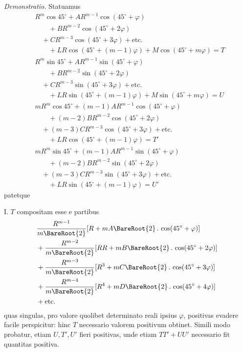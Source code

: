 \textit{Demonstratio.} Statuamus
\[
\begin{aligned}
&R^m\cos45^\circ+AR^{m-1}\cos(45^\circ+\varphi)\\
&\qquad+BR^{m-2}\cos(45^\circ+2\varphi)\\
&\quad+CR^{m-3}\cos(45^\circ+3\varphi)+\text{etc.}\\
&\qquad+LR\cos(45^\circ+(m-1)\varphi)+M\cos(45^\circ+m\varphi)=T\\
&R^m\sin45^\circ+AR^{m-1}\sin(45^\circ+\varphi)\\
&\qquad+BR^{m-2}\sin(45^\circ+2\varphi)\\
&\quad+CR^{m-3}\sin(45^\circ+3\varphi)+\text{etc.}\\
&\qquad+LR\sin(45^\circ+(m-1)\varphi)+M\sin(45^\circ+m\varphi)=U\\
&mR^m\cos45^\circ+(m-1)AR^{m-1}\cos(45^\circ+\varphi)\\
&\qquad+(m-2)BR^{m-2}\cos(45^\circ+2\varphi)\\
&\quad+(m-3)CR^{m-3}\cos(45^\circ+3\varphi)+\text{etc.}\\
&\qquad+LR\cos(45^\circ+(m-1)\varphi)=T'\\
&mR^m\sin45^\circ+(m-1)AR^{m-1}\sin(45^\circ+\varphi)\\
&\qquad+(m-2)BR^{m-2}\sin(45^\circ+2\varphi)\\
&\quad+(m-3)CR^{m-3}\sin(45^\circ+3\varphi)+\text{etc.}\\
&\qquad+LR\sin(45^\circ+(m-1)\varphi)=U'
\end{aligned}
\]
patetque

I. $T$ compositam esse e partibus
\[
\begin{aligned}
&\frac{R^{m-1}}{m\BareRoot{2}}[R+mA\BareRoot{2}\, .\,\cos(45^\circ+\varphi)]\\
&+\frac{R^{m-2}}{m\BareRoot{2}}[RR+mB\BareRoot{2}\, .\,\cos(45^\circ+2\varphi)]\\
&+\frac{R^{m-3}}{m\BareRoot{2}}[R^3+mC\BareRoot{2}\, .\,\cos(45^\circ+3\varphi)]\\
&+\frac{R^{m-4}}{m\BareRoot{2}}[R^4+mD\BareRoot{2}\, .\,\cos(45^\circ+4\varphi)]\\
&+\text{etc.}
\end{aligned}
\]
quas singulas, pro valore quolibet determinato reali ipsius $\varphi$, positivas evadere
facile perspicitur: hinc $T$ necessario valorem positivum obtinet. Simili modo
probatur, etiam $U,T',U'$ fieri positivas, unde etiam $TT'+UU'$ necessario
fit quantitas positiva.

